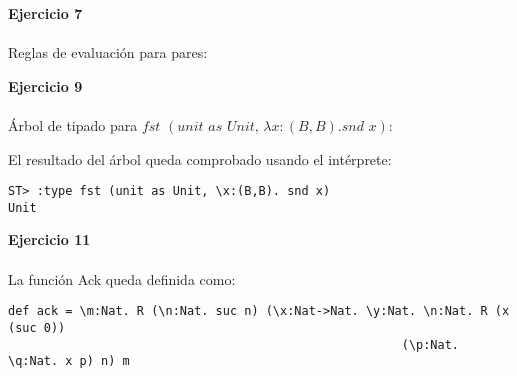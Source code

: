 \documentclass[12pt, a4paper]{article}
\begin{document}
\newpage
{\bf Ejercicio 7}\\
\\
Reglas de evaluación para pares:\\

\begin{multicols}{2}
\vspace{0.5cm}
\vspace{0.5cm}
\columnbreak
{}
\vspace{0.5cm}
\vspace{0.5cm}
\end{multicols}
{\bf Ejercicio 9}\\
\\
Árbol de tipado para $fst\, \, (unit\, \, as \, \, Unit,\, \lambda x : (B, B). snd\, \, x)$:
\\
\begin{center}
\begin{minipage}{\linewidth}
\end{minipage}
\end{center}
El resultado del árbol queda comprobado usando el intérprete:
\vspace{-0.5cm}
\begin{verbatim}
ST> :type fst (unit as Unit, \x:(B,B). snd x)
Unit
\end{verbatim}
{\bf Ejercicio 11}\\
\\
La función Ack queda definida como:
\vspace{-0.5cm}
\begin{verbatim}
def ack = \m:Nat. R (\n:Nat. suc n) (\x:Nat->Nat. \y:Nat. \n:Nat. R (x (suc 0)) 
                                                       (\p:Nat. \q:Nat. x p) n) m
\end{verbatim}
\newpage
\marginsize{2cm}{2cm}{2cm}{2cm}
\end{document}
